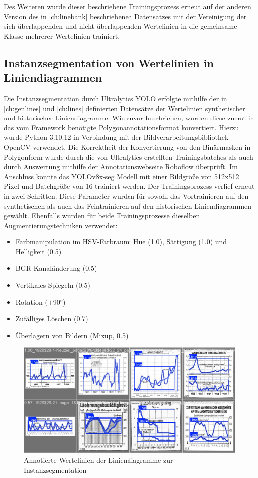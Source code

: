 Des Weiteren wurde dieser beschriebene Trainingsprozess erneut auf der anderen Version des in \ref{ch:linebank} beschriebenen Datensatzes mit der Vereinigung der sich überlappenden und nicht überlappenden Wertelinien in die gemeinsame Klasse mehrerer Wertelinien trainiert.

\subsection{Instanzsegmentation von Wertelinien in Liniendiagrammen}

Die Instanzsegmentation durch Ultralytics YOLO erfolgte mithilfe der in \ref{ch:genlines} und \ref{ch:lines} definierten Datensätze der Wertelinien synthetischer und historischer Liniendiagramme. Wie zuvor beschrieben, wurden diese zuerst in das vom Framework benötigte Polygonannotationsformat konvertiert. Hierzu wurde Python 3.10.12 in Verbindung mit der Bildverarbeitungsbibliothek OpenCV \cite{opencv_library} verwendet. Die Korrektheit der Konvertierung von den Binärmasken in Polygonform wurde durch die von Ultralytics erstellten Trainingsbatches als auch durch Auswertung mithilfe der Annotationswebseite Roboflow \cite{dwyer2024roboflow} überprüft. Im Anschluss konnte das YOLOv8x-seg Modell mit einer Bildgröße von 512x512 Pixel und Batchgröße von 16 trainiert werden. Der Trainingsprozess verlief erneut in zwei Schritten.
Diese Parameter wurden für sowohl das Vortrainieren auf den synthetischen als auch das Feintrainieren auf den historischen Liniendiagrammen gewählt. Ebenfalls wurden für beide Trainingsprozesse dieselben Augmentierungstechniken verwendet:

\begin{itemize}[itemsep=0pt, topsep=0pt]
    \item Farbmanipulation im HSV-Farbraum: Hue (1.0), Sättigung (1.0) und Helligkeit (0.5)
    \item BGR-Kanaländerung (0.5)
    \item Vertikales Spiegeln (0.5)
    \item Rotation ($\pm$90°)
    \item Zufälliges Löschen (0.7)
    \item Überlagern von Bildern (Mixup, 0.5)
\end{itemize}

\begin{figure}[H]
    \centering
    \captionsetup{width=.75\linewidth}
    \includegraphics[width=.75\textwidth]{Implementation/img/instance_annotated.png}
    \caption{ Annotierte Wertelinien der Liniendiagramme zur Instanzsegmentation}
    \label{fig:instance_annotated}
\end{figure}

